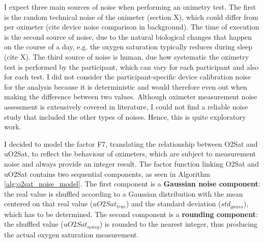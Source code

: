 I expect three main sources of noise when performing an oximetry test. The first is the random technical noise of the oximeter (section X), which could differ from per oximeter (cite device noise comparison in background). The time of execution is the second source of noise, due to the natural biological changes that happen on the course of a day, e.g. the oxygen saturation typically reduces during sleep (cite X). The third source of noise is human, due how systematic the oximetry test is performed by the participant, which can vary for each participant and also for each test. I did not consider the participant-specific device calibration noise for the analysis because it is deterministic and would therefore even out when making the difference between two values. Although oximeter measurement noise assessment is extensively covered in literature, I could not find a reliable noise study that included the other types of noises. Hence, this is quite exploratory work. 


I decided to model the factor F7, translating the relationship between O2Sat and uO2Sat, to reflect the behaviour of oximeters, which are subject to measurement noise and always provide an integer result. The factor function linking O2Sat and uO2Sat contains two sequential components, as seen in Algorithm \ref{alg:o2sat_noise_model}. The first component is a \textbf{Gaussian noise component}: the real value is shuffled according to a Gaussian distribution with the mean centered on that real value ($uO2Sat_{true}$) and the standard deviation ($std_{gauss}$), which has to be determined. The second component is a \textbf{rounding component}: the shuffled value ($uO2Sat_{noisy}$) is rounded to the nearest integer, thus producing the actual oxygen saturation measurement.

